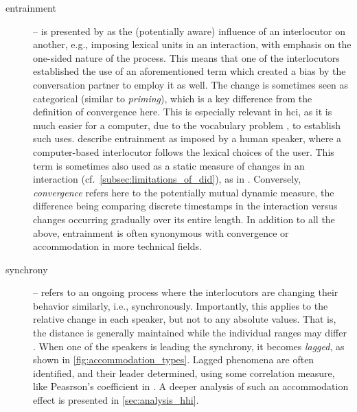 \begin{description}
	\item[entrainment] -- is presented by \citet{Brennan1996lexical} as the (potentially aware) influence of an interlocutor on another, e.g., imposing lexical units in an interaction, with emphasis on the one-sided nature of the process.
	This means that one of the interlocutors established the use of an aforementioned term which created a bias by the conversation partner to employ it as well.
	The change is sometimes seen as categorical (similar to \textit{priming}), which is a key difference from the definition of convergence here.
	This is especially relevant in \ac{hci}, as it is much easier for a computer, due to the vocabulary problem \citep{Furnas1987vocabulary}, to establish such uses.
	\citet{Lopes2013automated} describe entrainment as imposed by a human speaker, where a computer-based interlocutor follows the lexical choices of the user.
	This term is sometimes also used as a static measure of changes in an interaction (cf.\ \cref{subsec:limitations_of_did}), as in \citet{Levitan2013entrainment}.
	Conversely, \emph{convergence} refers here to the potentially mutual dynamic measure, the difference being comparing discrete timestamps in the interaction \citep[for example, between two halves of a session, as done by][]{Xia2014prosodic} versus changes occurring gradually over its entire length.
	In addition to all the above, entrainment is often synonymous with convergence or accommodation in more technical fields.
	
	\item[synchrony] -- refers to an ongoing process where the interlocutors are changing their behavior similarly, i.e., synchronously.
	Importantly, this applies to the relative change in each speaker, but not to any absolute values.
	That is, the distance is generally maintained while the individual ranges may differ \citep[see example in \cref{fig:synchrony_switchboard} and Figure 1 in][]{Levitan2011measuring}.
	When one of the speakers is leading the synchrony, it becomes \emph{lagged}, as shown in \cref{fig:accommodation_types}.
	Lagged phenomena are often identified, and their leader determined, using some correlation measure, like Peasrson's coefficient in \citet{Edlund2009pause, Xia2014prosodic}.
	A deeper analysis of such an accommodation effect is presented in \cref{sec:analysis_hhi}.
	

\end{description}
